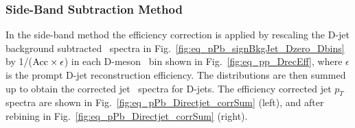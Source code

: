 %
%
%
%
%

\subsubsection{Side-Band Subtraction Method}
In the side-band method the efficiency correction is applied by rescaling the D-jet background subtracted \pt\ spectra in Fig.~\ref{fig:eq_pPb_signBkgJet_Dzero_Dbins}
by 1/(${\rm Acc} \times \epsilon$) in each D-meson \pt\ bin shown in Fig.~\ref{fig:eq_pp_DrecEff}, where $\epsilon$ is the prompt D-jet reconstruction efficiency.
The distributions are then summed up to obtain the corrected jet \pt\ spectra for D-jets. 
The efficiency corrected jet $p_{T}$ spectra are shown in Fig.~\ref{fig:eq_pPb_Directjet_corrSum} (left), and after rebining in Fig.~\ref{fig:eq_pPb_Directjet_corrSum} (right).

